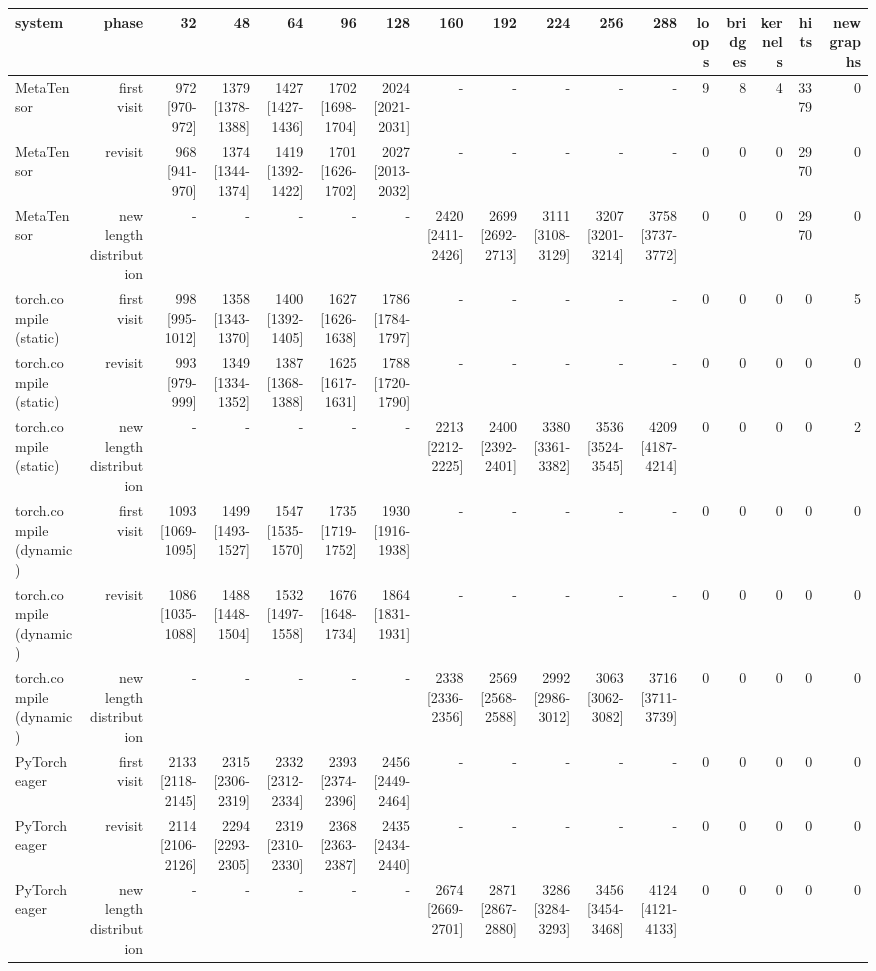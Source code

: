 \begin{tabular}{lrrrrrrrrrrrrrrrr}
\toprule
system & phase & 32 & 48 & 64 & 96 & 128 & 160 & 192 & 224 & 256 & 288 & loops & bridges & kernels & hits & new graphs \\
\midrule
MetaTensor & first visit & 972 [970-972] & 1379 [1378-1388] & 1427 [1427-1436] & 1702 [1698-1704] & 2024 [2021-2031] & - & - & - & - & - & 9 & 8 & 4 & 3379 & 0 \\
MetaTensor & revisit & 968 [941-970] & 1374 [1344-1374] & 1419 [1392-1422] & 1701 [1626-1702] & 2027 [2013-2032] & - & - & - & - & - & 0 & 0 & 0 & 2970 & 0 \\
MetaTensor & new length distribution & - & - & - & - & - & 2420 [2411-2426] & 2699 [2692-2713] & 3111 [3108-3129] & 3207 [3201-3214] & 3758 [3737-3772] & 0 & 0 & 0 & 2970 & 0 \\
torch.compile (static) & first visit & 998 [995-1012] & 1358 [1343-1370] & 1400 [1392-1405] & 1627 [1626-1638] & 1786 [1784-1797] & - & - & - & - & - & 0 & 0 & 0 & 0 & 5 \\
torch.compile (static) & revisit & 993 [979-999] & 1349 [1334-1352] & 1387 [1368-1388] & 1625 [1617-1631] & 1788 [1720-1790] & - & - & - & - & - & 0 & 0 & 0 & 0 & 0 \\
torch.compile (static) & new length distribution & - & - & - & - & - & 2213 [2212-2225] & 2400 [2392-2401] & 3380 [3361-3382] & 3536 [3524-3545] & 4209 [4187-4214] & 0 & 0 & 0 & 0 & 2 \\
torch.compile (dynamic) & first visit & 1093 [1069-1095] & 1499 [1493-1527] & 1547 [1535-1570] & 1735 [1719-1752] & 1930 [1916-1938] & - & - & - & - & - & 0 & 0 & 0 & 0 & 0 \\
torch.compile (dynamic) & revisit & 1086 [1035-1088] & 1488 [1448-1504] & 1532 [1497-1558] & 1676 [1648-1734] & 1864 [1831-1931] & - & - & - & - & - & 0 & 0 & 0 & 0 & 0 \\
torch.compile (dynamic) & new length distribution & - & - & - & - & - & 2338 [2336-2356] & 2569 [2568-2588] & 2992 [2986-3012] & 3063 [3062-3082] & 3716 [3711-3739] & 0 & 0 & 0 & 0 & 0 \\
PyTorch eager & first visit & 2133 [2118-2145] & 2315 [2306-2319] & 2332 [2312-2334] & 2393 [2374-2396] & 2456 [2449-2464] & - & - & - & - & - & 0 & 0 & 0 & 0 & 0 \\
PyTorch eager & revisit & 2114 [2106-2126] & 2294 [2293-2305] & 2319 [2310-2330] & 2368 [2363-2387] & 2435 [2434-2440] & - & - & - & - & - & 0 & 0 & 0 & 0 & 0 \\
PyTorch eager & new length distribution & - & - & - & - & - & 2674 [2669-2701] & 2871 [2867-2880] & 3286 [3284-3293] & 3456 [3454-3468] & 4124 [4121-4133] & 0 & 0 & 0 & 0 & 0 \\
\bottomrule
\end{tabular}
